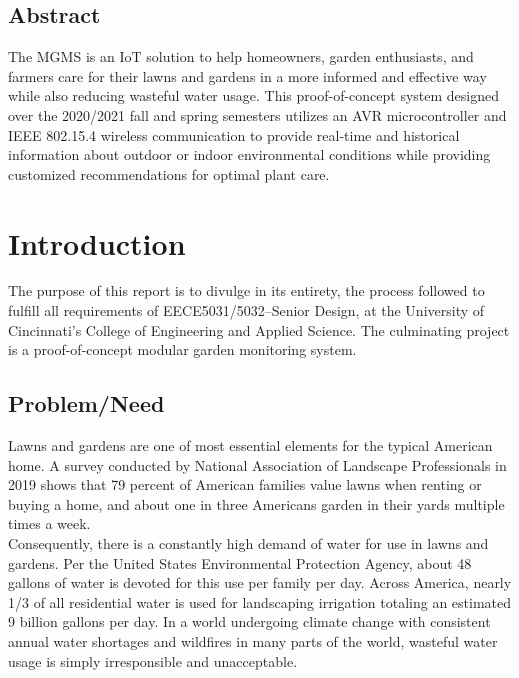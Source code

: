 \documentclass{report}
\begin{document}
\tableofcontents

\newpage
\section*{Abstract}
The MGMS is an IoT solution to help homeowners, garden enthusiasts, and farmers care for their lawns and gardens in a more informed and effective way while also reducing wasteful water usage. This proof-of-concept system designed over the 2020/2021 fall and spring semesters utilizes an AVR microcontroller and IEEE 802.15.4 wireless communication to provide real-time and historical information about outdoor or indoor environmental conditions while providing customized recommendations for optimal plant care.


\chapter{Introduction}
The purpose of this report is to divulge in its entirety, the process followed to fulfill all requirements of EECE5031/5032–Senior Design, at the University of Cincinnati’s College of Engineering and Applied Science. The culminating project is a proof-of-concept modular garden monitoring system.

\section{Problem/Need}

Lawns and gardens are one of most essential elements for the typical American home. A survey conducted by National Association of Landscape Professionals in 2019 shows that 79 percent of American families value lawns when renting or buying a home, and about one in three Americans garden in their yards multiple times a week\cite{noauthor_new_2019}. \\

Consequently, there is a constantly high demand of water for use in lawns and gardens. Per the United States Environmental Protection Agency, about 48 gallons of water is devoted for this use per family per day. Across America, nearly 1/3 of all residential water is used for landscaping irrigation totaling an estimated 9 billion gallons per day\cite{epa_outdoor_nodate}. In a world undergoing climate change with consistent annual water shortages and wildfires in many parts of the world, wasteful water usage is simply irresponsible and unacceptable. \\
\end{document}
